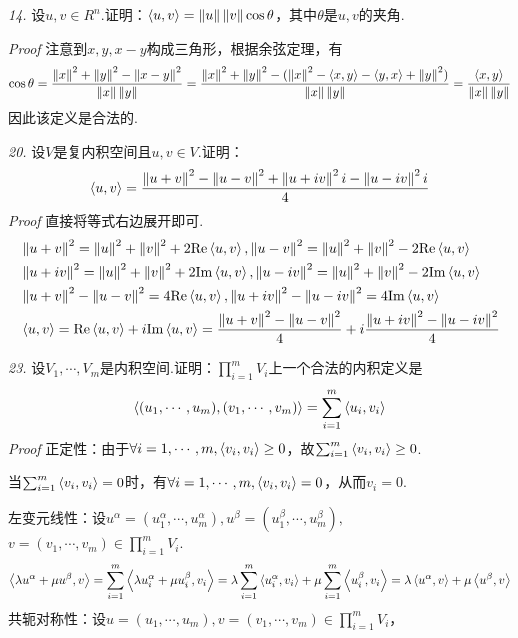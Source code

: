 \hspace*{\fill}

\textit{14.}
设\(u,v \in R^n\).证明：\(\ip{u}{v}=\norm{u}\norm{v}\cos \theta\)，其中\(\theta\)是\(u,v\)的夹角.

\textit{Proof}
注意到\(x,y,x-y\)构成三角形，根据余弦定理，有
    \begin{align*}
        \cos \theta =\dfrac{\norm{x}^2+\norm{y}^2-\norm{x-y}^2}{\norm{x}\norm{y}}
        =\dfrac{\norm{x}^2+\norm{y}^2-(\norm{x}^2-\ip{x}{y}-\ip{y}{x}+\norm{y}^2)}{\norm{x}\norm{y}}
        =\dfrac{\ip{x}{y}}{\norm{x}\norm{y}}
    \end{align*}
因此该定义是合法的.

\newpage

\textit{20.}
设\(V\)是复内积空间且\(u,v \in V\).证明：
    \begin{align*}
        \ip{u}{v}=\dfrac{\norm{u+v}^2-\norm{u-v}^2+\norm{u+iv}^2i-\norm{u-iv}^2i}{4}
    \end{align*}
\textit{Proof}
直接将等式右边展开即可.
    \begin{align*}
        &\norm{u+v}^2=\norm{u}^2+\norm{v}^2+2\mathrm{Re}\ip{u}{v},
        \norm{u-v}^2=\norm{u}^2+\norm{v}^2-2\mathrm{Re}\ip{u}{v} \\
        &\norm{u+iv}^2=\norm{u}^2+\norm{v}^2+2\mathrm{Im}\ip{u}{v},
        \norm{u-iv}^2=\norm{u}^2+\norm{v}^2-2\mathrm{Im}\ip{u}{v} \\
        &\norm{u+v}^2-\norm{u-v}^2=4\mathrm{Re}\ip{u}{v},
        \norm{u+iv}^2-\norm{u-iv}^2=4\mathrm{Im}\ip{u}{v} \\
        &\ip{u}{v}=\mathrm{Re}\ip{u}{v}+i\mathrm{Im}\ip{u}{v}
        =\dfrac{\norm{u+v}^2-\norm{u-v}^2}{4}+i\dfrac{\norm{u+iv}^2-\norm{u-iv}^2}{4}
    \end{align*}

\hspace*{\fill}

\textit{23.}
设\(V_1,\cdots,V_m\)是内积空间.证明：\(\prod_{i=1}^m V_i\)上一个合法的内积定义是
    \begin{align*}
        \ip{(u_1,\cdots,u_m)}{(v_1,\cdots,v_m)}=\sum_{i=1}^m \ip{u_i}{v_i}
    \end{align*}
\textit{Proof}
正定性：由于\(\forall i=1,\cdots,m,\ip{v_i}{v_i} \geq 0\)，故\(\sum_{i=1}^m \ip{v_i}{v_i} \geq 0\).

当\(\sum_{i=1}^m \ip{v_i}{v_i}=0\)时，有\(\forall i=1,\cdots,m,\ip{v_i}{v_i}=0\)，从而\(v_i=0\).

左变元线性：设\(u^\alpha=(u_1^\alpha,\cdots,u_m^\alpha),u^\beta=(u_1^\beta,\cdots,u_m^\beta),\)
\(v=(v_1,\cdots,v_m) \in \prod_{i=1}^m V_i\).
    \begin{align*}
        \ip{\lambda u^\alpha+\mu u^\beta}{v}=\sum_{i=1}^m \ip{\lambda u_i^\alpha+\mu u_i^\beta}{v_i}
        =\lambda \sum_{i=1}^m \ip{u_i^\alpha}{v_i}+\mu \sum_{i=1}^m \ip{u_i^\beta}{v_i}
        =\lambda \ip{u^\alpha}{v}+\mu \ip{u^\beta}{v} 
    \end{align*}
共轭对称性：设\(u=(u_1,\cdots,u_m),v=(v_1,\cdots,v_m) \in \prod_{i=1}^m V_i\)，

